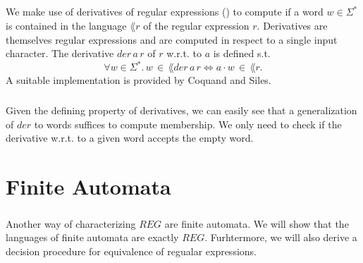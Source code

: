 \documentclass[11pt,a4paper,oneside]{book}
\begin{document}
                    \paragraph{}
                We make use of derivatives of regular expressions (\cite{DBLP:journals/jacm/Brzozowski64}) to compute if a word $w \in \Sigma^*$ is contained in the language $\lang{r}$ of the regular expression $r$. Derivatives are themselves regular expressions and are computed in respect to a single input character. The derivative $der \,  a \, r$ of $r$ w.r.t. to $a$ is defined s.t. 
                \[
                    \forall w \in \Sigma^*. \, w \, \in \, \lang{der \, a \, r} \Leftrightarrow a\cdot w \, \in \, \lang{r}.
                \]
                A suitable implementation is provided by Coquand and Siles.


                \paragraph{} 
                    Given the defining property of derivatives, we can easily see that a generalization of $der$ to words suffices to compute membership. We only need to check if the derivative w.r.t. to a given word accepts the empty word.


            

    \chapter{Finite Automata}
        \paragraph{} 
        Another way of characterizing $REG$ are finite automata. 
        We will show that the languages of finite automata are exactly $REG$. 
        Furhtermore, we will also derive a decision procedure for equivalence of regualar expressions.
\end{document}
